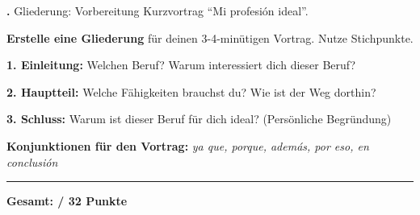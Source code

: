\documentclass[11pt,a4paper]{article}
\newcommand{\luecke}[1]{\underline{\hspace{#1}}}
\newcommand{\punktebox}[1]{\hfill\fbox{\small \_\_/#1}}
\newcommand{\es}[1]{\textit{#1}}
\newcounter{aufgabe}
\newcommand{\aufgabe}[2]{%
    \stepcounter{aufgabe}%
    \vspace{0.8em}%
    \noindent\textbf{\theaufgabe.} #1 \punktebox{#2}%
    \vspace{0.3em}%
}
\begin{document}
\vspace{0.8em}

\aufgabe{Gliederung: Vorbereitung Kurzvortrag ``Mi profesión ideal''.}{10}

\begin{buchverweis}
\textbf{Erstelle eine Gliederung} für deinen 3-4-minütigen Vortrag. Nutze Stichpunkte.
\end{buchverweis}

\vspace{0.3em}
\textbf{1. Einleitung:} Welchen Beruf? Warum interessiert dich dieser Beruf?

\luecke{12cm}

\luecke{12cm}

\vspace{0.5em}
\textbf{2. Hauptteil:} Welche Fähigkeiten brauchst du? Wie ist der Weg dorthin?

\luecke{12cm}

\luecke{12cm}

\luecke{12cm}

\vspace{0.5em}
\textbf{3. Schluss:} Warum ist dieser Beruf für dich ideal? (Persönliche Begründung)

\luecke{12cm}

\luecke{12cm}

\vspace{0.5em}
\textbf{Konjunktionen für den Vortrag:} \es{ya que, porque, además, por eso, en conclusión}

\vspace{1em}
\hrule
\vspace{0.3em}
\begin{flushright}
\textbf{Gesamt: \luecke{1cm} / 32 Punkte}
\end{flushright}
\end{document}
